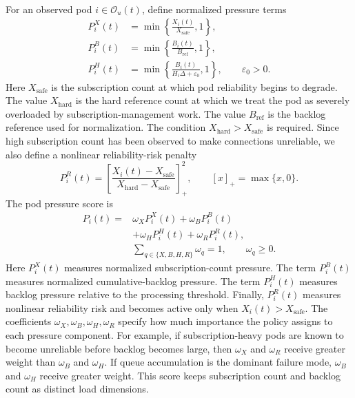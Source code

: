 \documentclass[manuscript]{acmart}
\begin{document}
For an observed pod $i\in\mathcal{O}_u(t)$, define normalized pressure terms
\begin{align}
	P^X_i(t) &= \min\left\{\frac{X_i(t)}{X_{\mathrm{safe}}},1\right\},\\
	P^B_i(t) &= \min\left\{\frac{B_i(t)}{B_{\mathrm{ref}}},1\right\},\\
	P^H_i(t) &= \min\left\{\frac{B_i(t)}{H_i\Delta+\varepsilon_0},1\right\},
	\qquad \varepsilon_0>0.
\end{align}
Here $X_{\mathrm{safe}}$ is the subscription count at which pod reliability begins to
degrade. The value $X_{\mathrm{hard}}$ is the hard reference count at which we treat the
pod as severely overloaded by subscription-management work.
The value $B_{\mathrm{ref}}$ is the backlog reference used for normalization. The condition
$X_{\mathrm{hard}}>X_{\mathrm{safe}}$ is required. Since high subscription count has been
observed to make connections unreliable, we also define a nonlinear
reliability-risk penalty
\begin{equation}
	P^R_i(t)=
	\left[
	\frac{X_i(t)-X_{\mathrm{safe}}}
	{X_{\mathrm{hard}}-X_{\mathrm{safe}}}
	\right]_+^2,
	\qquad [x]_+=\max\{x,0\}.
\end{equation}
The pod pressure score is
\begin{align}
	P_i(t)=
	&\omega_X P^X_i(t)
	+\omega_B P^B_i(t) \nonumber\\
	&+\omega_H P^H_i(t)
	+\omega_R P^R_i(t),
	\label{eq:pod_pressure}\\
	&\sum_{q\in\{X,B,H,R\}}\omega_q=1,\qquad \omega_q\geq 0. \nonumber
\end{align}
Here $P^X_i(t)$ measures normalized subscription-count pressure.
The term $P^B_i(t)$ measures normalized cumulative-backlog pressure.
The term $P^H_i(t)$ measures backlog pressure relative to the processing threshold.
Finally, $P^R_i(t)$ measures nonlinear reliability risk and becomes active only
when $X_i(t)>X_{\mathrm{safe}}$. The coefficients
$\omega_X,\omega_B,\omega_H,\omega_R$ specify how much importance the policy
assigns to each pressure component. For example, if subscription-heavy pods are
known to become unreliable before backlog becomes large, then $\omega_X$ and
$\omega_R$ receive greater weight than $\omega_B$ and $\omega_H$. If queue
accumulation is the dominant failure mode, $\omega_B$ and $\omega_H$
receive greater weight. This score keeps subscription count and backlog
count as distinct load dimensions.
\end{document}

